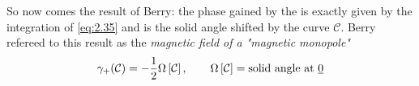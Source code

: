 So now comes the result of Berry: the phase gained by the \wf is exactly given by the integration of \eqref{eq:2.35} and is the solid angle shifted by the curve $ \mathcal{C} $. Berry refereed to this result as the \textit{magnetic field of a "magnetic monopole"}
\begin{equation}
\gamma_{+}(\mathcal{C})=-\dfrac{1}{2}\Omega\left[\mathcal{C}\right], \qquad \Omega\left[\mathcal{C}\right]=\text{solid angle at \underline{0}}
\end{equation}